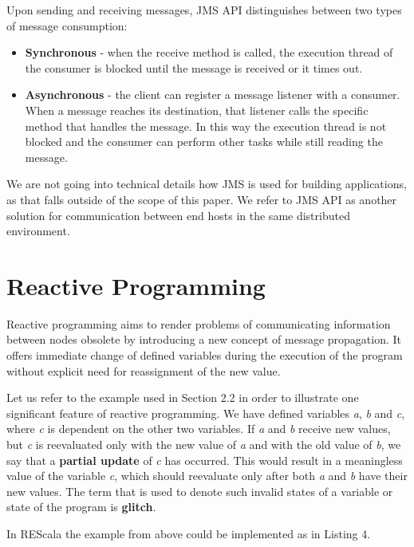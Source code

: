 \documentclass{sigplanconf}
\begin{document}
Upon sending and receiving messages, JMS API distinguishes between two types of message consumption:
\begin{itemize} \itemsep1pt \parskip0pt 
\item \textbf{Synchronous} - when the receive method is called, the execution thread of the consumer is blocked until the message is received or it times out.
\item \textbf{Asynchronous} - the client can register a message listener with a consumer. When a message reaches its destination, that listener calls the specific method that handles the message. In this way the execution thread is not blocked and the consumer can perform other tasks while still reading the message.

\end{itemize}

We are not going into technical details how JMS is used for building applications, as that falls outside of the scope of this paper. We refer to JMS API as another solution for communication between end hosts in the same distributed environment.

\section{Reactive Programming}

Reactive programming aims to render problems of communicating information between nodes obsolete by introducing a new concept of message propagation. It offers immediate change of defined variables during the execution of the program without explicit need for reassignment of the new value.

Let us refer to the example used in Section 2.2 in order to illustrate one significant feature of reactive programming. We have defined variables \textit{a}, \textit{b} and \textit{c}, where \textit{c}  is dependent on the other two variables. If \textit{a} and \textit{b} receive new values, but \textit{c} is reevaluated only with the new value of \textit{a} and with the old value of \textit{b}, we say that a \textbf{partial update} of \textit{c} has occurred. This would result in a meaningless value of the variable \textit{c}, which should reevaluate only after both \textit{a} and \textit{b} have their new values. The term that is used to denote such invalid states of a variable or state of the program is \textbf{glitch}.

In REScala the example from above could be implemented as in Listing 4.
\end{document}
